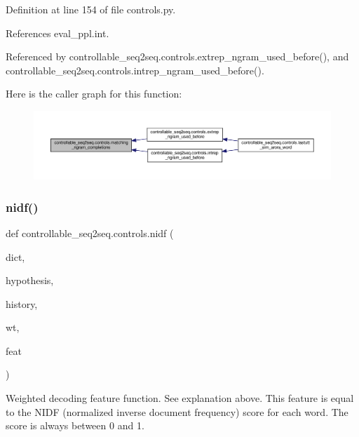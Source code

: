 Definition at line 154 of file controls.\+py.



References eval\+\_\+ppl.\+int.



Referenced by controllable\+\_\+seq2seq.\+controls.\+extrep\+\_\+ngram\+\_\+used\+\_\+before(), and controllable\+\_\+seq2seq.\+controls.\+intrep\+\_\+ngram\+\_\+used\+\_\+before().

Here is the caller graph for this function\+:
\nopagebreak
\begin{figure}[H]
\begin{center}
\leavevmode
\includegraphics[width=350pt]{namespacecontrollable__seq2seq_1_1controls_a4c775d3518037c2505c0bb4a69bb1dd5_icgraph}
\end{center}
\end{figure}
\mbox{\label{namespacecontrollable__seq2seq_1_1controls_a06371a18df2fc3cc43efbbbacc94a0d5}} 
\subsubsection{\texorpdfstring{nidf()}{nidf()}}
{\footnotesize\ttfamily def controllable\+\_\+seq2seq.\+controls.\+nidf (\begin{DoxyParamCaption}\item[{}]{dict,  }\item[{}]{hypothesis,  }\item[{}]{history,  }\item[{}]{wt,  }\item[{}]{feat }\end{DoxyParamCaption})}

\begin{DoxyVerb}Weighted decoding feature function. See explanation above.
This feature is equal to the NIDF (normalized inverse document frequency) score for
each word. The score is always between 0 and 1.
\end{DoxyVerb}
 


